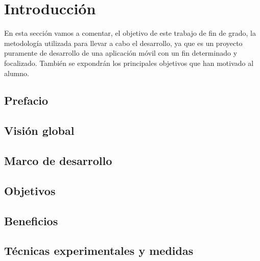\section{Introducción}
\setlength{\parskip}{0.5cm}

En esta sección vamos a comentar, el objetivo de este trabajo de fin de grado, la metodología utilizada para llevar a cabo el desarrollo, ya que es un proyecto puramente de desarrollo de una aplicación móvil con un fin determinado y focalizado. También se expondrán los principales objetivos que han motivado al alumno. 

\subsection{Prefacio}


\subsection{Visión global}


\subsection{Marco de desarrollo}


\subsection{Objetivos}


\subsection{Beneficios}


\subsection{Técnicas experimentales y medidas}
